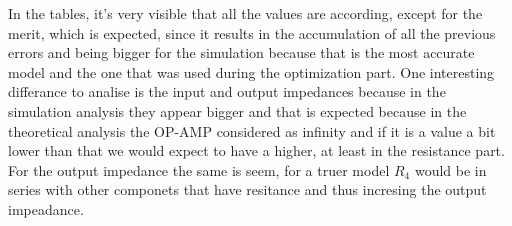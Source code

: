 In the tables, it's very visible that all the values are according, except for the merit, which is expected, since it results in the accumulation of all the previous errors and being bigger for the simulation because that is the most accurate model and the one that was used during the optimization part. One interesting differance to analise is the input and output impedances because in the simulation analysis they appear bigger and that is expected because in the theoretical analysis the OP-AMP considered as infinity and if it is a value a bit lower than that we would expect to have a higher, at least in the resistance part. For the output impedance the same is seem, for a truer model $R_{4}$ would be in series with other componets that have resitance and thus incresing the output impeadance.